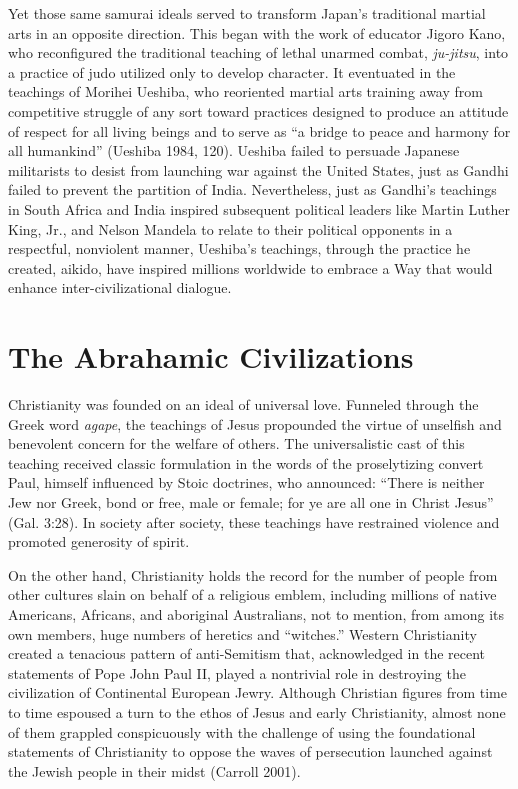 Yet those same samurai ideals served to transform Japan's traditional martial arts in an opposite direction. This began with the work of educator Jigoro Kano, who reconfigured the traditional teaching of lethal unarmed combat, \emph{ju-jitsu}, into a practice of judo utilized only to develop character. It eventuated in the teachings of Morihei Ueshiba, who reoriented martial arts training away from competitive struggle of any sort toward practices designed to produce an attitude of respect for all living beings and to serve as ``a bridge to peace and harmony for all humankind'' (Ueshiba 1984, 120). Ueshiba failed to persuade Japanese militarists to desist from launching war against the United States, just as Gandhi failed to prevent the partition of India. Nevertheless, just as Gandhi's teachings in South Africa and India inspired subsequent political leaders like Martin Luther King, Jr., and Nelson Mandela to relate to their political opponents in a respectful, nonviolent manner, Ueshiba's teachings, through the practice he created, aikido, have inspired millions worldwide to embrace a Way that would enhance inter-civilizational dialogue.

\section*{The Abrahamic Civilizations}

Christianity was founded on an ideal of universal love. Funneled through the Greek word \emph{agape}, the teachings of Jesus propounded the virtue of unselfish and benevolent concern for the welfare of others. The universalistic cast of this teaching received classic formulation in the words of the proselytizing convert Paul, himself influenced by Stoic doctrines, who announced: ``There is neither Jew nor Greek, bond or free, male or female; for ye are all one in Christ Jesus'' (Gal. 3:28). In society after society, these teachings have restrained violence and promoted generosity of spirit.

On the other hand, Christianity holds the record for the number of people from other cultures slain on behalf of a religious emblem, including millions of native Americans, Africans, and aboriginal Australians, not to mention, from among its own members, huge numbers of heretics and ``witches.'' Western Christianity created a tenacious pattern of anti-Semitism that, acknowledged in the recent statements of Pope John Paul II, played a nontrivial role in destroying the civilization of Continental European Jewry. Although Christian figures from time to time espoused a turn to the ethos of Jesus and early Christianity, almost none of them grappled conspicuously with the challenge of using the foundational statements of Christianity to oppose the waves of persecution launched against the Jewish people in their midst (Carroll 2001).

